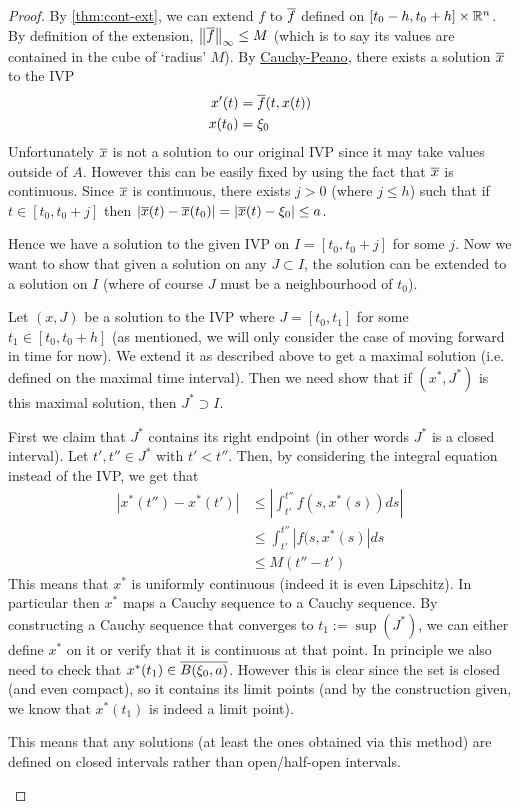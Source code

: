 \begin{proof}
By \autoref{thm:cont-ext}, we can extend $f$ to $\overline{f}$ defined on $[t_0 - h, t_0 + h] \times \mathbb{R}^n$. By definition of the extension, $\left\lVert\overline{f}\right\rVert_{\infty} \leq M$ (which is to say its values are contained in the cube of `radius' $M$). By \hyperref[thm:cau-pen]{Cauchy-Peano}, there exists a solution $\overline{x}$ to the IVP
\begin{align*}
    x'(t) &= \overline{f}(t, x(t))\\
    x(t_0) &= \xi_0
\end{align*}
Unfortunately $\overline{x}$ is not a solution to our original IVP since it may take values outside of $A$. However this can be easily fixed by using the fact that $\overline{x}$ is continuous. Since $\overline{x}$ is continuous, there exists $j > 0$ (where $j \leq h$) such that if $t \in [t_0, t_0 + j]$ then $|\overline{x}(t) - \overline{x}(t_0)| = |\overline{x}(t) - \xi_0| \leq a$. 

Hence we have a solution to the given IVP on $I = [t_0, t_{0} + j]$ for some $j$. Now we want to show that given a solution on any $J \subset I$, the solution can be extended to a solution on $I$ (where of course $J$ must be a neighbourhood of $t_0$).

Let $(x, J)$ be a solution to the IVP where $J = [t_0, t_1]$ for some $t_1 \in [t_0, t_0 + h]$ (as mentioned, we will only consider the case of moving forward in time for now). We extend it as described above to get a maximal solution (i.e. defined on the maximal time interval). Then we need show that if $(x^*, J^*)$ is this maximal solution, then $J^* \supset I$.

First we claim that $J^*$ contains its right endpoint (in other words $J^*$ is a closed interval).
Let $t', t'' \in J^*$ with $t' < t''$. Then, by considering the integral equation instead of the IVP, we get that
\begin{align*}
    \left| x^*(t'') - x^*(t') \right| &\leq \left| \int_{t'}^{t''} f(s, x^*(s)) ds \right|\\
    &\leq \int_{t'}^{t''} \left| f(s, x^* (s) \right| ds\\
    &\leq M(t'' - t')
\end{align*}
This means that $x^*$ is uniformly continuous (indeed it is even Lipschitz). In particular then $x^*$ maps a Cauchy sequence to a Cauchy sequence. By constructing a Cauchy sequence that converges to $t_1 := \sup(J^*)$, we can either define $x^*$ on it or verify that it is continuous at that point. In principle we also need to check that $x^*(t_1) \in \overline{B(\xi_0, a)}$. However this is clear since the set is closed (and even compact), so it contains its limit points (and by the construction given, we know that $x^*(t_1)$ is indeed a limit point). 
\begin{remark}
    This means that any solutions (at least the ones obtained via this method) are defined on closed intervals rather than open/half-open intervals.
\end{remark}


\end{proof}
